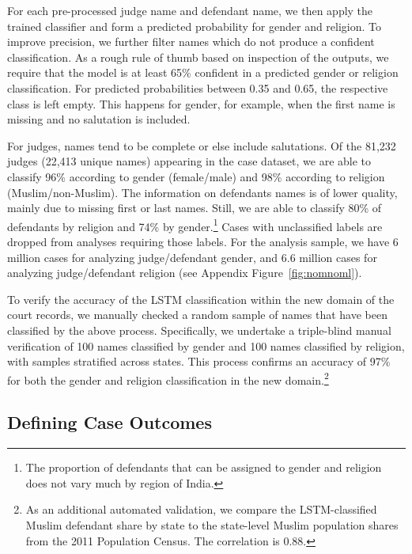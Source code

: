 \documentclass[12pt,english]{article}
\begin{document}
For each pre-processed judge name and defendant name, we then apply the trained classifier and form a predicted probability for gender and religion. To improve precision, we further filter names which do not produce a confident classification. As a rough rule of thumb based on inspection of the outputs, we require that the model is at least 65\% confident in a predicted gender or religion classification. For predicted probabilities between 0.35 and 0.65, the respective class is left empty. This happens for gender, for example, when the first name is missing and no salutation is included.  

For judges, names tend to be complete or else include salutations. Of the 81,232 judges (22,413 unique names) appearing in the case dataset, we are able to classify 96\% according to gender (female/male) and 98\% according to religion (Muslim/non-Muslim). The information on defendants names is of lower quality, mainly due to missing first or last names. Still, we are able to classify 80\% of defendants by religion and 74\% by gender.\footnote{The proportion of defendants that can be assigned to gender and religion does not vary much by region of India.} Cases with unclassified labels are dropped from analyses requiring those labels. For the analysis sample, we have 6 million cases for analyzing judge/defendant gender, and 6.6 million cases for analyzing judge/defendant religion (see Appendix Figure~\ref{fig:nomnoml}).

To verify the accuracy of the LSTM classification within the new domain of the court records, we manually checked a random sample of names that have been classified by the above process. Specifically, we undertake a triple-blind manual verification of 100 names classified by gender and 100 names classified by religion, with samples stratified across states. This process confirms an accuracy of 97\% for both the gender and religion classification in the new domain.\footnote{As an additional automated validation, we compare the LSTM-classified Muslim defendant share by state to the state-level Muslim population shares from the 2011 Population Census. The correlation is 0.88.}

\subsection{Defining Case Outcomes}
\end{document}
